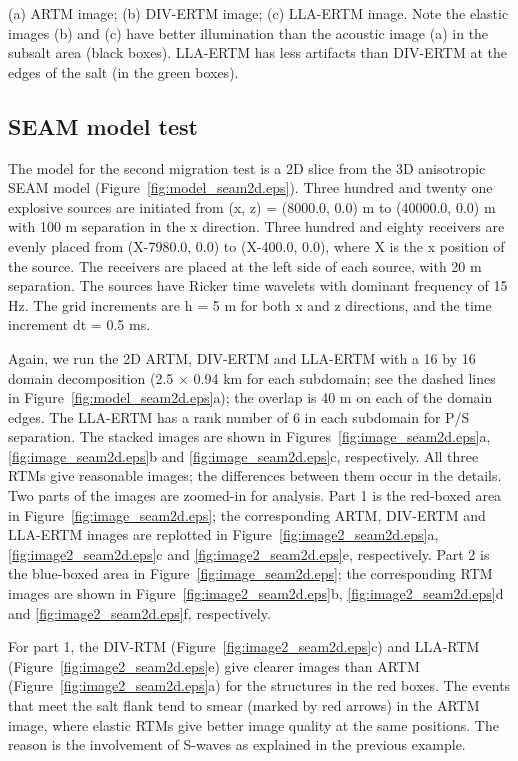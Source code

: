 \documentclass[manuscript,ulem,graphix,revised]{geophysics}
\begin{document}
{
\small{(a) ARTM image; (b) DIV-ERTM image; (c) LLA-ERTM image. Note the elastic images (b) and (c) have better illumination than the acoustic image (a) in the subsalt area (black boxes). LLA-ERTM has less artifacts than DIV-ERTM at the edges of the salt (in the green boxes).}
}

\subsection{SEAM model test}
\indent\indent
The model for the second migration test is a 2D slice from the 3D anisotropic SEAM model \citep{fehler11} (Figure~\ref{fig:model_seam2d.eps}). Three hundred and twenty one explosive sources are initiated from (x, z) = (8000.0, 0.0) m to  (40000.0, 0.0) m with 100 m separation in the x direction. Three hundred and eighty receivers are evenly placed from (X-7980.0, 0.0) to (X-400.0, 0.0), where X is the x position of the source. The receivers are placed at the left side of each source, with 20 m separation. The sources have Ricker time wavelets with dominant frequency of 15 Hz. The grid increments are h = 5 m for both x and z directions, and the time increment dt = 0.5 ms.

Again, we run the 2D ARTM, DIV-ERTM and LLA-ERTM with a 16 by 16 domain decomposition (2.5 $\times$ 0.94 km for each subdomain; see the dashed lines in Figure~\ref{fig:model_seam2d.eps}a); the overlap is 40 m on each of the domain edges. The LLA-ERTM has a rank number of 6 in each subdomain for P/S separation. The stacked images are shown in Figures~\ref{fig:image_seam2d.eps}a, \ref{fig:image_seam2d.eps}b and \ref{fig:image_seam2d.eps}c, respectively. All three RTMs give reasonable images; the differences between them occur in the details.
Two parts of the images are zoomed-in for analysis. Part 1 is the red-boxed area in Figure~\ref{fig:image_seam2d.eps}; the corresponding ARTM, DIV-ERTM and LLA-ERTM images are replotted in Figure~\ref{fig:image2_seam2d.eps}a, \ref{fig:image2_seam2d.eps}c and \ref{fig:image2_seam2d.eps}e, respectively. 
Part 2 is the blue-boxed area in Figure~\ref{fig:image_seam2d.eps}; the corresponding RTM images are shown in Figure~\ref{fig:image2_seam2d.eps}b, \ref{fig:image2_seam2d.eps}d and \ref{fig:image2_seam2d.eps}f, respectively.

For part 1, the DIV-RTM (Figure~\ref{fig:image2_seam2d.eps}c) and LLA-RTM (Figure~\ref{fig:image2_seam2d.eps}e) give clearer images than ARTM (Figure~\ref{fig:image2_seam2d.eps}a) for the structures in the red boxes. 
The events that meet the salt flank tend to smear (marked by red arrows) in the ARTM image, where elastic RTMs give better image quality at the same positions.
The reason is the involvement of S-waves as explained in the previous example. 
\end{document}
